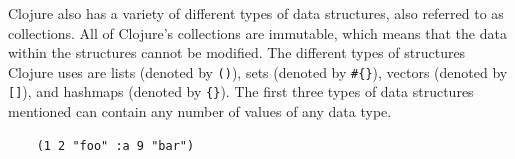 \documentclass[12pt]{article}
\newcommand{\comment}[1]{{\bf \tt  {#1}}}
\newcommand{\emcomment}[1]{\textcolor{ForestGreen}{\comment{Elena: {#1}}}}
\newcommand{\mmcomment}[1]{\textcolor{magenta}{\comment{Max: {#1}}}}
\begin{document}


Clojure also has a variety of different types of data structures, also referred to as collections. All 
of Clojure's collections are immutable, which means that the data within the structures cannot be
modified. 
The different types of structures Clojure uses are lists (denoted by \texttt{()}), sets (denoted by
\texttt{\#\{\}}), vectors (denoted by \texttt{[]}), and hashmaps (denoted by \texttt{\{\}}). The first
three types of data structures mentioned can contain any number of values of any data type.
\begin{verbatim}
	(1 2 "foo" :a 9 "bar")
\end{verbatim}


\end{document}
